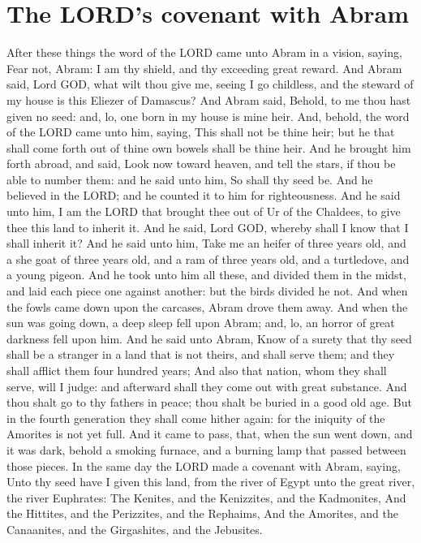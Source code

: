 \section*{The LORD's covenant with Abram}
\begin{biblechapter} %
\verse After these things the word of the LORD came unto Abram in a vision, saying, Fear not, Abram: I am thy shield, and thy exceeding great reward.
\verse And Abram said, Lord GOD, what wilt thou give me, seeing I go childless, and the steward of my house is this Eliezer of Damascus?
\verse And Abram said, Behold, to me thou hast given no seed: and, lo, one born in my house is mine heir.
\verse And, behold, the word of the LORD came unto him, saying, This shall not be thine heir; but he that shall come forth out of thine own bowels shall be thine heir.
\verse And he brought him forth abroad, and said, Look now toward heaven, and tell the stars, if thou be able to number them: and he said unto him, So shall thy seed be.
\verse And he believed in the LORD; and he counted it to him for righteousness.
\verse And he said unto him, I am the LORD that brought thee out of Ur of the Chaldees, to give thee this land to inherit it.
\verse And he said, Lord GOD, whereby shall I know that I shall inherit it?
\verse And he said unto him, Take me an heifer of three years old, and a she goat of three years old, and a ram of three years old, and a turtledove, and a young pigeon.
\verse And he took unto him all these, and divided them in the midst, and laid each piece one against another: but the birds divided he not.
\verse And when the fowls came down upon the carcases, Abram drove them away.
\verse And when the sun was going down, a deep sleep fell upon Abram; and, lo, an horror of great darkness fell upon him.
\verse And he said unto Abram, Know of a surety that thy seed shall be a stranger in a land that is not theirs, and shall serve them; and they shall afflict them four hundred years;
\verse And also that nation, whom they shall serve, will I judge: and afterward shall they come out with great substance.
\verse And thou shalt go to thy fathers in peace; thou shalt be buried in a good old age.
\verse But in the fourth generation they shall come hither again: for the iniquity of the Amorites is not yet full.
\verse And it came to pass, that, when the sun went down, and it was dark, behold a smoking furnace, and a burning lamp that passed between those pieces.
\verse In the same day the LORD made a covenant with Abram, saying, Unto thy seed have I given this land, from the river of Egypt unto the great river, the river Euphrates:
\verse The Kenites, and the Kenizzites, and the Kadmonites,
\verse And the Hittites, and the Perizzites, and the Rephaims,
\verse And the Amorites, and the Canaanites, and the Girgashites, and the Jebusites.
\end{biblechapter}

